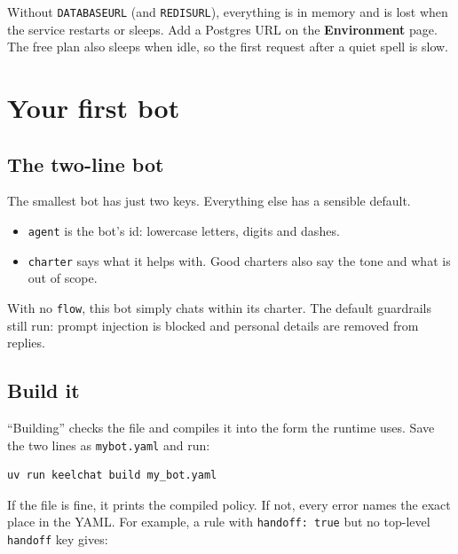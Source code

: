 \documentclass[11pt,a4paper]{article}
\newcommand{\snip}[1]{}
\newcommand{\codeus}{\textunderscore\allowbreak}
\newcommand{\code}[1]{{\renewcommand{\_}{\codeus}\texttt{\upshape #1}}}
\newcommand{\key}[1]{{\renewcommand{\_}{\codeus}\texttt{\color{ckey}#1}}}
\begin{document}
\begin{warn}
Without \code{DATABASE\_URL} (and \code{REDIS\_URL}), everything is in memory and is lost when the service restarts
or sleeps. Add a Postgres URL on the \textbf{Environment} page. The free plan also sleeps when idle, so the first
request after a quiet spell is slow.
\end{warn}

\section{Your first bot}

\subsection{The two-line bot}

The smallest bot has just two keys. Everything else has a sensible default.

\snip{01_first_bot.yaml}

\begin{itemize}[leftmargin=1.2em]
  \item \key{agent} is the bot's id: lowercase letters, digits and dashes.
  \item \key{charter} says what it helps with. Good charters also say the tone and what is out of scope.
\end{itemize}

With no \key{flow}, this bot simply chats within its charter. The default guardrails still run: prompt injection
is blocked and personal details are removed from replies.

\subsection{Build it}

``Building'' checks the file and compiles it into the form the runtime uses. Save the two lines as
\code{my\_bot.yaml} and run:

\begin{lstlisting}[style=bashstyle]
uv run keelchat build my_bot.yaml
\end{lstlisting}

If the file is fine, it prints the compiled policy. If not, every error names the exact place in the YAML. For
example, a rule with \code{handoff: true} but no top-level \key{handoff} key gives:
\end{document}
